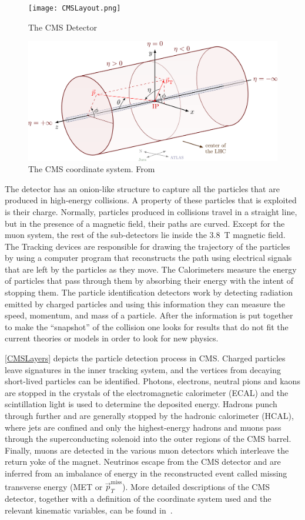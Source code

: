 \begin{figure}
	\centering
	\texttt{[image: CMSLayout.png]}
	\caption[CMS Detector]{The CMS Detector \cite{CMS_detector}}
	\label{CMSLayout}
\end{figure}
\begin{figure}
	\centering
	\includegraphics[width=.8\linewidth]{Images/CMS Coordinate.png}
	\caption[The CMS coordinate system]{The CMS coordinate system. From \cite{izaakneutelings2024}}
	\label{fig:CMSCoord}
\end{figure}
The detector has an onion-like structure to capture all the particles that are produced in high-energy collisions.
A property of these particles that is exploited is their charge. Normally, particles produced in collisions travel in a straight line, but in the presence of a magnetic field, their paths are curved.
Except for the muon system, the rest of the sub-detectors lie inside the 3.8~\unit{T} magnetic field.
The Tracking devices are responsible for drawing the trajectory of the particles by using a computer program that reconstructs the path using electrical signals that are left by the particles as they move. The Calorimeters measure the energy of particles that pass through them by absorbing their energy with the intent of stopping them.
The particle identification detectors work by detecting radiation emitted by charged particles and using this information they can measure the speed, momentum, and mass of a particle. After the information is put together to make the “snapshot” of the collision one looks for results that do not fit the current theories or models in order to look for new physics.

\autoref{CMSLayers} depicts the particle detection process in CMS. Charged particles leave signatures in the inner tracking system, and the vertices from decaying short-lived particles can be identified. Photons, electrons, neutral pions and kaons are stopped in the crystals of the electromagnetic calorimeter (ECAL) and the scintillation light is used to determine the deposited energy. Hadrons punch through further and are generally stopped by the hadronic calorimeter (HCAL), where jets are confined and only the highest-energy hadrons and muons pass through the superconducting solenoid into the outer regions of the CMS barrel. Finally, muons are detected in the various muon detectors which interleave the return yoke of the magnet. Neutrinos escape from the CMS detector and are inferred from an imbalance of energy in the reconstructed event called missing transverse energy (MET or $\vec{p}_T^{\text{miss}}$).
More detailed descriptions of the CMS detector, together with a definition of the coordinate system used and the relevant kinematic variables, can be found in~\cite{CMS:2008xjf,CMS:2023gfb}.

